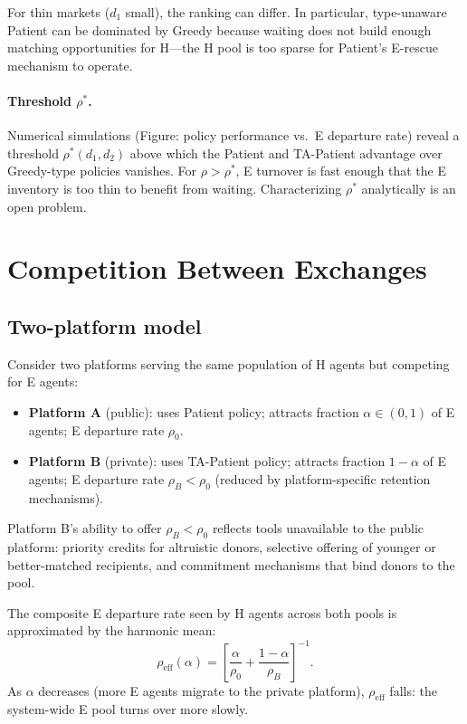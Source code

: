 \documentclass{article}
\theoremstyle{plain}
\theoremstyle{definition}
\begin{document}
For thin markets ($d_1$ small), the ranking can differ.  In particular,
type-unaware Patient can be dominated by Greedy because waiting does not
build enough matching opportunities for H---the H pool is too sparse for
Patient's E-rescue mechanism to operate.

\paragraph{Threshold $\rho^*$.}
Numerical simulations (Figure: policy performance vs.\ E departure rate)
reveal a threshold $\rho^*(d_1,d_2)$ above which the Patient and TA-Patient
advantage over Greedy-type policies vanishes.  For $\rho>\rho^*$, E turnover
is fast enough that the E inventory is too thin to benefit from waiting.
Characterizing $\rho^*$ analytically is an open problem.

\section{Competition Between Exchanges}
\label{sec:competition}

\subsection{Two-platform model}

Consider two platforms serving the same population of H agents but
competing for E agents:
\begin{itemize}
\item \textbf{Platform A} (public): uses Patient policy; attracts fraction
  $\alpha\in(0,1)$ of E agents; E departure rate $\rho_0$.
\item \textbf{Platform B} (private): uses TA-Patient policy; attracts
  fraction $1-\alpha$ of E agents; E departure rate $\rho_B<\rho_0$
  (reduced by platform-specific retention mechanisms).
\end{itemize}
Platform B's ability to offer $\rho_B<\rho_0$ reflects tools unavailable to
the public platform: priority credits for altruistic donors, selective
offering of younger or better-matched recipients, and commitment mechanisms
that bind donors to the pool.

The composite E departure rate seen by H agents across both pools is
approximated by the harmonic mean:
\begin{equation}\label{eq:eff-rho}
  \rho_{\mathrm{eff}}(\alpha)
  = \left[\frac{\alpha}{\rho_0}+\frac{1-\alpha}{\rho_B}\right]^{-1}.
\end{equation}
As $\alpha$ decreases (more E agents migrate to the private platform),
$\rho_{\mathrm{eff}}$ falls: the system-wide E pool turns over more slowly.
\end{document}
